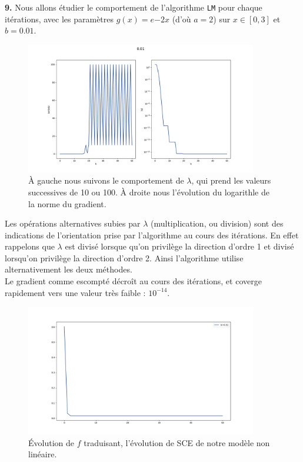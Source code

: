\documentclass[12pt]{article}
\begin{document}
\textbf{\color{brick}9.} Nous allons étudier le comportement de l'algorithme \verb|LM| pour chaque itérations, avec les paramètres $g(x)= e{-2x}$ (d'où $a=2$) sur $x \in [0,3]$ et $b=0.01$.
\begin{figure}[H]
\centering
\includegraphics[width=0.9\textwidth]{Q0_L_G.png}
\caption{ À gauche nous suivons le comportement de $\lambda$, qui prend les valeurs successives de 10 ou  100. À droite nous l'évolution du logarithle de la norme du gradient.}
\label{FigQ9}
\end{figure}
Les opérations alternatives subies par $\lambda$ (multiplication, ou division) sont des indications de l'orientation prise par l'algorithme au cours des itérations. En effet rappelons que $\lambda$ est divisé lorsque qu'on privilège la direction d'ordre 1 et divisé lorsqu'on privilège la direction d'ordre 2. Ainsi l'algorithme utilise alternativement les deux méthodes.\\
Le gradient comme escompté décroît au cours des itérations, et coverge rapidement  vers une valeur très faible : $10^{-14}$.

\begin{figure}[H]
\centering
\includegraphics[width=0.9\textwidth]{Q9_F.png}
\caption{ Évolution de $f$ traduisant, l'évolution de SCE de notre modèle non linéaire. }
\label{FigQ9}
\end{figure}
 
\end{document}
